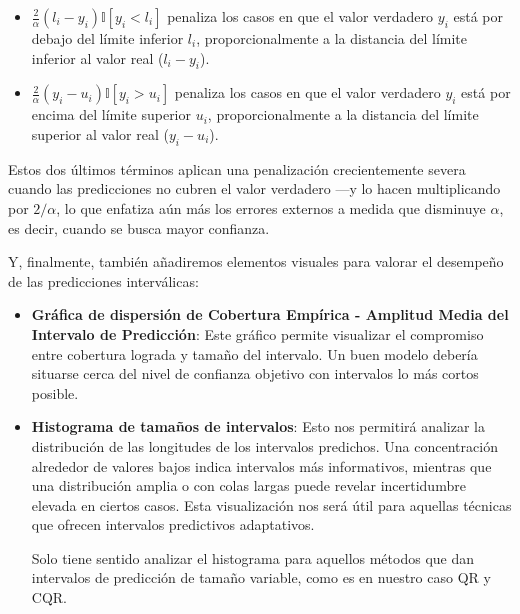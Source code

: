 \begin{itemize}
    \begin{itemize}
        \item $\frac{2}{\alpha} \left( l_i-y_i \right) \mathbb{I}\left[ y_i<l_i \right]$ penaliza los casos en que el valor verdadero $y_i$ está por debajo del límite inferior $l_i$, proporcionalmente a la distancia del límite inferior al valor real ($l_i-y_i$).
        \item $\frac{2}{\alpha}  \left( y_i-u_i \right) \mathbb{I}\left[ y_i>u_i \right]$ penaliza los casos en que el valor verdadero $y_i$ está por encima del límite superior $u_i$, proporcionalmente a la distancia del límite superior al valor real ($y_i-u_i$).
    \end{itemize}

    Estos dos últimos términos aplican una penalización crecientemente severa cuando las predicciones no cubren el valor verdadero ---y lo hacen multiplicando por $2/\alpha$, lo que enfatiza aún más los errores externos a medida que disminuye $\alpha$, es decir, cuando se busca mayor confianza.

\end{itemize}

Y, finalmente, también añadiremos elementos visuales para valorar el desempeño de las predicciones interválicas:

\begin{itemize}

    \item \textbf{Gráfica de dispersión de Cobertura Empírica - Amplitud Media del Intervalo de Predicción}: Este gráfico permite visualizar el compromiso entre cobertura lograda y tamaño del intervalo. Un buen modelo debería situarse cerca del nivel de confianza objetivo con intervalos lo más cortos posible. 

    \item \textbf{Histograma de tamaños de intervalos}: Esto nos permitirá analizar la distribución de las longitudes de los intervalos predichos. Una concentración alrededor de valores bajos indica intervalos más informativos, mientras que una distribución amplia o con colas largas puede revelar incertidumbre elevada en ciertos casos. Esta visualización nos será útil para aquellas técnicas que ofrecen intervalos predictivos adaptativos. 
    
    Solo tiene sentido analizar el histograma para aquellos métodos que dan intervalos de predicción de tamaño variable, como es en nuestro caso QR y CQR. 

\end{itemize}

